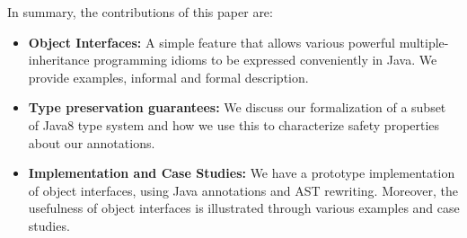 In summary, the contributions of this paper are:
\begin{itemize}

\item {\bf Object Interfaces:} A simple feature that allows various
  powerful multiple-inheritance programming idioms to be expressed
  conveniently in Java. We provide examples, informal and formal description.

\item{\bf Type preservation guarantees:}
We discuss our formalization of a subset of Java8 type system and how we use this
to characterize safety properties about our annotations.

\item {\bf Implementation and Case Studies:} We have a prototype
  implementation of object interfaces, using Java
  annotations and AST rewriting. Moreover, the usefulness of object interfaces is
  illustrated through various examples and case studies.



\end{itemize}
